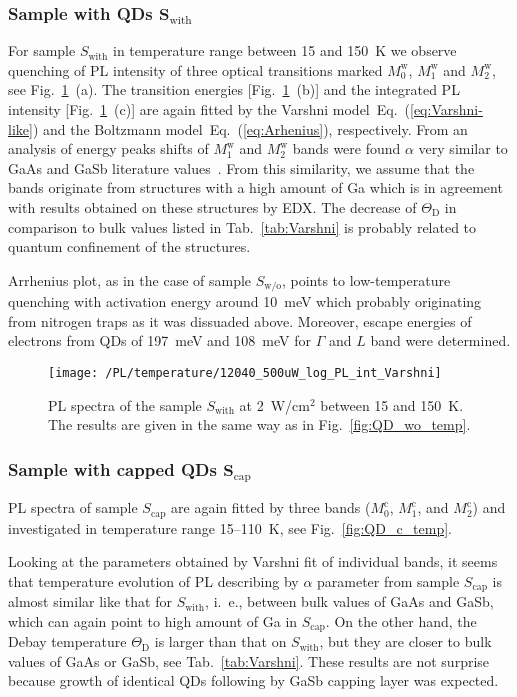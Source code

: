 \subsubsection*{Sample with QDs $\mathbf{S_\mathrm{with}}$}
%
For sample $S_\mathrm{with}$ in temperature range between 15 and 150~K we observe quenching of PL intensity of three optical transitions marked $M_0^\mathrm{w}$, $M_1^\mathrm{w}$ and $M_2^\mathrm{w}$, see Fig.~\ref{fig:QD_w_temp}~(a). The transition energies [Fig.~\ref{fig:QD_w_temp}~(b)] and the integrated PL intensity [Fig.~\ref{fig:QD_w_temp}~(c)] are again fitted by the Varshni model~Eq.~(\ref{eq:Varshni-like}) and the Boltzmann model~Eq.~(\ref{eq:Arhenius}), respectively.%
%
From an analysis of energy peaks shifts of $M_1^\mathrm{w}$ and $M_2^\mathrm{w}$ bands were found $\alpha$ very similar to GaAs and GaSb literature values~\cite{Vurgaftman}. From this similarity, we assume that the bands originate from structures with a high amount of Ga which is in agreement with results obtained on these structures by EDX. The decrease of $\Theta_\mathrm{D}$ in comparison to bulk values listed in Tab.~\ref{tab:Varshni} is probably related to quantum confinement of the structures.

Arrhenius plot, as in the case of sample $S_\mathrm{w/o}$, points to low-temperature quenching with activation energy around 10~meV which probably originating from nitrogen traps as it was dissuaded above. Moreover, escape energies of electrons from QDs of 197~meV and 108~meV for $\Gamma$ and $L$ band were determined. 
%
\begin{figure}
	\centering
	\texttt{[image: /PL/temperature/12040\_500uW\_log\_PL\_int\_Varshni]}
	\caption{PL spectra of the sample ${S_\mathrm{with}}$ at 2~W/cm$^2$ between 15 and 150~K. The results are given in the same way as in Fig.~\ref{fig:QD_wo_temp}.}
	\label{fig:QD_w_temp}
\end{figure}

\subsubsection*{Sample with capped QDs $\mathbf{S_\mathrm{cap}}$}
%
PL spectra of sample ${S_\mathrm{cap}}$ are again fitted by three bands ($M_0^\mathrm{c}$, $M_1^\mathrm{c}$, and $M_2^\mathrm{c}$) and investigated in temperature range 15--110~K, see Fig.~\ref{fig:QD_c_temp}.

Looking at the parameters obtained by Varshni fit of individual bands, it seems that temperature evolution of PL describing by $\alpha$ parameter from sample ${S_\mathrm{cap}}$ is almost similar like that for ${S_\mathrm{with}}$, i.~e., between bulk values of GaAs and GaSb, which can again point to high amount of Ga in ${S_\mathrm{cap}}$. On the other hand, the Debay temperature $\Theta_\mathrm{D}$ is larger than that on ${S_\mathrm{with}}$, but they are closer to bulk values of GaAs or GaSb, see Tab.~\ref{tab:Varshni}. These results are not surprise because growth of identical QDs following by GaSb capping layer was expected.

